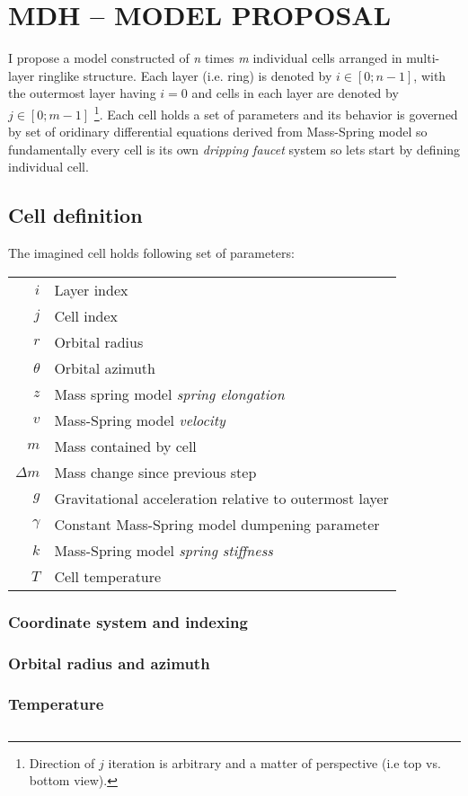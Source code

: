 \chapter{MDH -- MODEL PROPOSAL}
\thispagestyle{empty}

I propose a model constructed of \emph{n} times \emph{m} individual cells arranged in multi-layer ringlike structure. Each layer (i.e. ring) is denoted by $i \in [0; n-1]$, with the outermost layer having $i = 0$ and cells in each layer are denoted by $j \in [0; m-1]$ \footnote{Direction of $j$ iteration is arbitrary and a matter of perspective (i.e top vs. bottom view).}. Each cell holds a set of parameters and its behavior is governed by set of oridinary differential equations derived from Mass-Spring model so fundamentally every cell is its own \emph{dripping faucet} system so lets start by defining individual cell.  

\section{Cell definition}
The imagined cell holds following set of parameters:

\begin{center}
\begin{tabular}{r|l}
$i$			& Layer index \\
$j$			& Cell index \\
$r$			& Orbital radius \\
$\theta$	& Orbital azimuth \\ 
$z$			& Mass spring model \emph{spring elongation}  \\
$v$			& Mass-Spring model \emph{velocity} \\
$m$			& Mass contained by cell \\
$\Delta m$ 	& Mass change since previous step \\
$g$			& Gravitational acceleration relative to outermost layer \\
$\gamma$	& Constant Mass-Spring model dumpening parameter \\
$k$			& Mass-Spring model \emph{spring stiffness} \\
$T$			& Cell temperature \\ 
\end{tabular}
\end{center}

\subsection{Coordinate system and indexing}

\subsection{Orbital radius and azimuth}

\subsection{Temperature}



\section{}
